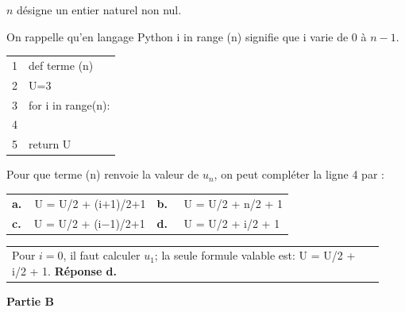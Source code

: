 \begin{enumerate}
\begin{minipage}{0.58\linewidth}
$n$ désigne un entier naturel non nul. 

On rappelle qu'en langage Python
\og i in range (n)\fg{} signifie que i varie de 0 à $n-1$.
\end{minipage}\hfill
\begin{minipage}{0.38\linewidth}
\begin{tabular}{|c|l|}\hline
1&def terme (n)\\
2&\qquad U=3\\
3&\qquad for i in range(n): \\
4& \dotfill \\
5&\qquad return U\\ \hline
\end{tabular}
\end{minipage}

Pour que terme (n) renvoie la valeur de $u_n$, on peut compléter la ligne 4 par : 

\begin{center}
\begin{tabularx}{\linewidth}{*{2}{X}}
\textbf{a.~~}U = U/2 + (i$+$1)/2+1	&\textbf{b.~~} U = U/2 + n/2 + 1\\
\textbf{c.~~}U = U/2 + (i$-$1)/2+1 	&\textbf{d.~~} U = U/2 + i/2 + 1
\end{tabularx}
\end{center}

\begin{tabular}{@{\hspace*{0.05\linewidth}} || p{0.93\linewidth}}
Pour $i=0$, il faut calculer $u_1$; la seule formule valable est: U = U/2 + i/2 + 1.
\hfill\textbf{Réponse d.}
\end{tabular}

\end{enumerate}

\bigskip

\textbf{Partie B}

\medskip

